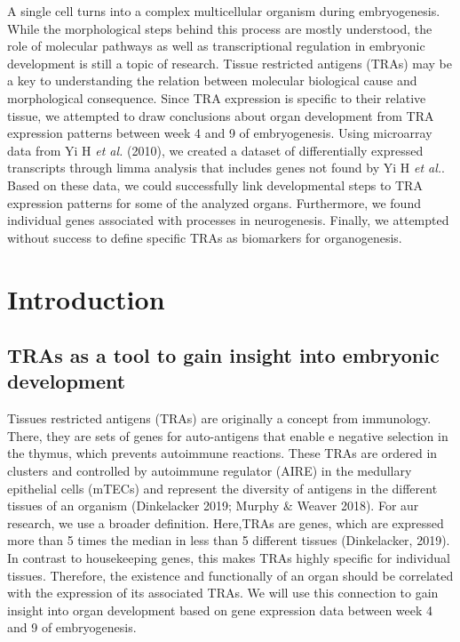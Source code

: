 \documentclass[
]{article}
\begin{document}
A single cell turns into a complex multicellular organism during embryogenesis. While the morphological steps behind this process are mostly understood, the role of molecular pathways as well as transcriptional regulation in embryonic development is still a topic of research. Tissue restricted antigens (TRAs) may be a key to understanding the relation between molecular biological cause and morphological consequence. Since TRA expression is specific to their relative tissue, we attempted to draw conclusions about organ development from TRA expression patterns between week 4 and 9 of embryogenesis. Using microarray data from Yi H \emph{et al.} (2010), we created a dataset of differentially expressed transcripts through limma analysis that includes genes not found by Yi H \emph{et al.}. Based on these data, we could successfully link developmental steps to TRA expression patterns for some of the analyzed organs. Furthermore, we found individual genes associated with processes in neurogenesis. Finally, we attempted without success to define specific TRAs as biomarkers for organogenesis.

\newpage

\hypertarget{introduction}{%
\section{Introduction}\label{introduction}}

\hypertarget{intro-tra}{%
\subsection{TRAs as a tool to gain insight into embryonic development}\label{intro-tra}}

Tissues restricted antigens (TRAs) are originally a concept from immunology. There, they are sets of genes for auto-antigens that enable e negative selection in the thymus, which prevents autoimmune reactions. These TRAs are ordered in clusters and controlled by autoimmune regulator (AIRE) in the medullary epithelial cells (mTECs) and represent the diversity of antigens in the different tissues of an organism (Dinkelacker 2019; Murphy \& Weaver 2018). For aur research, we use a broader definition. Here,TRAs are genes, which are expressed more than 5 times the median in less than 5 different tissues (Dinkelacker, 2019). In contrast to housekeeping genes, this makes TRAs highly specific for individual tissues. Therefore, the existence and functionally of an organ should be correlated with the expression of its associated TRAs. We will use this connection to gain insight into organ development based on gene expression data between week 4 and 9 of embryogenesis.
\end{document}
